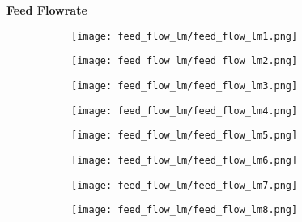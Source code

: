 \documentclass{article}
\begin{document}
    \textbf{Feed Flowrate}
    \begin{figure}[H]
        \centering
        \begin{subfigure}{0.48\linewidth}
		    \texttt{[image: feed\_flow\_lm/feed\_flow\_lm1.png]}
	    \end{subfigure}
	    \begin{subfigure}{0.48\linewidth}
		    \texttt{[image: feed\_flow\_lm/feed\_flow\_lm2.png]}
	    \end{subfigure}
	    \begin{subfigure}{0.48\linewidth}
		    \texttt{[image: feed\_flow\_lm/feed\_flow\_lm3.png]}
	    \end{subfigure}
	    \begin{subfigure}{0.48\linewidth}
		    \texttt{[image: feed\_flow\_lm/feed\_flow\_lm4.png]}
	    \end{subfigure}
	    \begin{subfigure}{0.48\linewidth}
		    \texttt{[image: feed\_flow\_lm/feed\_flow\_lm5.png]}
	    \end{subfigure}
	    \begin{subfigure}{0.48\linewidth}
		    \texttt{[image: feed\_flow\_lm/feed\_flow\_lm6.png]}
	    \end{subfigure}
	    \begin{subfigure}{0.48\linewidth}
		    \texttt{[image: feed\_flow\_lm/feed\_flow\_lm7.png]}
	    \end{subfigure}
	    \begin{subfigure}{0.48\linewidth}
		    \texttt{[image: feed\_flow\_lm/feed\_flow\_lm8.png]}
	    \end{subfigure}
    \end{figure}
    
    \pagebreak    
\end{document}
